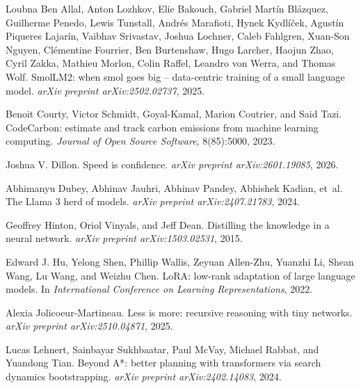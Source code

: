 \documentclass{article}
\begin{document}
\begin{thebibliography}{}

Loubna Ben Allal, Anton Lozhkov, Elie Bakouch, Gabriel Mart\'in Bl\'azquez, Guilherme Penedo, Lewis Tunstall, Andr\'es Marafioti, Hynek Kydl\'i\v{c}ek, Agust\'in Piqueres Lajar\'in, Vaibhav Srivastav, Joshua Lochner, Caleb Fahlgren, Xuan-Son Nguyen, Cl\'ementine Fourrier, Ben Burtenshaw, Hugo Larcher, Haojun Zhao, Cyril Zakka, Mathieu Morlon, Colin Raffel, Leandro von Werra, and Thomas Wolf.
SmolLM2: when smol goes big -- data-centric training of a small language model.
\textit{arXiv preprint arXiv:2502.02737}, 2025.

Benoit Courty, Victor Schmidt, Goyal-Kamal, Marion Coutrier, and Said Tazi.
CodeCarbon: estimate and track carbon emissions from machine learning computing.
\textit{Journal of Open Source Software}, 8(85):5000, 2023.

Joshua V. Dillon.
Speed is confidence.
\textit{arXiv preprint arXiv:2601.19085}, 2026.

Abhimanyu Dubey, Abhinav Jauhri, Abhinav Pandey, Abhishek Kadian, et~al.
The Llama 3 herd of models.
\textit{arXiv preprint arXiv:2407.21783}, 2024.

Geoffrey Hinton, Oriol Vinyals, and Jeff Dean.
Distilling the knowledge in a neural network.
\textit{arXiv preprint arXiv:1503.02531}, 2015.

Edward J. Hu, Yelong Shen, Phillip Wallis, Zeyuan Allen-Zhu, Yuanzhi Li, Shean Wang, Lu Wang, and Weizhu Chen.
LoRA: low-rank adaptation of large language models.
In \textit{International Conference on Learning Representations}, 2022.

Alexia Jolicoeur-Martineau.
Less is more: recursive reasoning with tiny networks.
\textit{arXiv preprint arXiv:2510.04871}, 2025.

Lucas Lehnert, Sainbayar Sukhbaatar, Paul McVay, Michael Rabbat, and Yuandong Tian.
Beyond A*: better planning with transformers via search dynamics bootstrapping.
\textit{arXiv preprint arXiv:2402.14083}, 2024.


\end{thebibliography}
\end{document}
